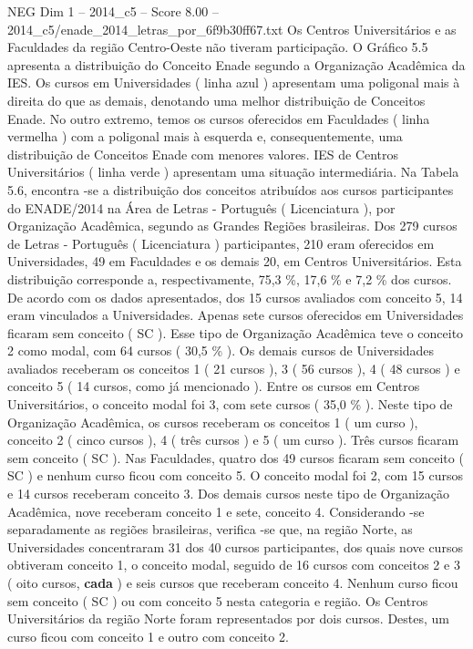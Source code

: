 \begin{textsample}{NEG Dim 1 – 2014\_c5 – Score 8.00 – 2014\_c5/enade\_2014\_letras\_por\_6f9b30ff67.txt}
Os Centros Universitários e as Faculdades da região Centro-Oeste não tiveram participação.
O Gráfico 5.5 apresenta a distribuição do Conceito Enade segundo a Organização Acadêmica da IES.
Os cursos em Universidades ( linha azul ) apresentam uma poligonal mais à direita do que as demais, denotando uma melhor distribuição de Conceitos Enade.
No outro extremo, temos os cursos oferecidos em Faculdades ( linha vermelha ) com a poligonal mais à esquerda e, consequentemente, uma distribuição de Conceitos Enade com menores valores.
IES de Centros Universitários ( linha verde ) apresentam uma situação intermediária.
Na Tabela 5.6, encontra -se a distribuição dos conceitos atribuídos aos cursos participantes do ENADE/2014 na Área de Letras - Português ( Licenciatura ), por Organização Acadêmica, segundo as Grandes Regiões brasileiras.
Dos 279 cursos de Letras - Português ( Licenciatura ) participantes, 210 eram oferecidos em Universidades, 49 em Faculdades e os demais 20, em Centros Universitários.
Esta distribuição corresponde a, respectivamente, 75,3 \%, 17,6 \% e 7,2 \% dos cursos.
De acordo com os dados apresentados, dos 15 cursos avaliados com conceito 5, 14 eram vinculados a Universidades.
Apenas sete cursos oferecidos em Universidades ficaram sem conceito ( SC ).
Esse tipo de Organização Acadêmica teve o conceito 2 como modal, com 64 cursos ( 30,5 \% ).
Os demais cursos de Universidades avaliados receberam os conceitos 1 ( 21 cursos ), 3 ( 56 cursos ), 4 ( 48 cursos ) e conceito 5 ( 14 cursos, como já mencionado ).
Entre os cursos em Centros Universitários, o conceito modal foi 3, com sete cursos ( 35,0 \% ).
Neste tipo de Organização Acadêmica, os cursos receberam os conceitos 1 ( um curso ), conceito 2 ( cinco cursos ), 4 ( três cursos ) e 5 ( um curso ).
Três cursos ficaram sem conceito ( SC ).
Nas Faculdades, quatro dos 49 cursos ficaram sem conceito ( SC ) e nenhum curso ficou com conceito 5.
O conceito modal foi 2, com 15 cursos e 14 cursos receberam conceito 3.
Dos demais cursos neste tipo de Organização Acadêmica, nove receberam conceito 1 e sete, conceito 4.
Considerando -se separadamente as regiões brasileiras, verifica -se que, na região Norte, as Universidades concentraram 31 dos 40 cursos participantes, dos quais nove cursos obtiveram conceito 1, o conceito modal, seguido de 16 cursos com conceitos 2 e 3 ( oito cursos, \textbf{cada} ) e seis cursos que receberam conceito 4.
Nenhum curso ficou sem conceito ( SC ) ou com conceito 5 nesta categoria e região.
Os Centros Universitários da região Norte foram representados por dois cursos.
Destes, um curso ficou com conceito 1 e outro com conceito 2.

\end{textsample}
